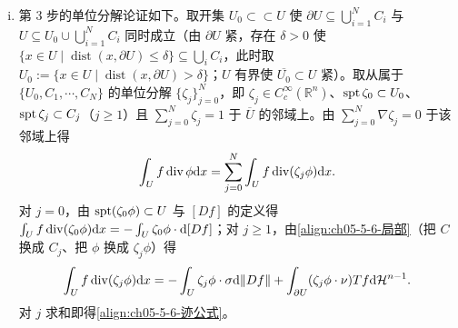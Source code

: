 \documentclass[../../main.tex]{subfiles}%
\begin{document}
\begin{remark}
\begin{enumerate}[(i)]
\item 第 3 步的单位分解论证如下。取开集 $U_0\subset\subset U$ 使 $\partial U\subseteq\bigcup_{i=1}^{N}C_i$ 与 $U\subseteq U_0\cup\bigcup_{i=1}^{N}C_i$ 同时成立（由 $\partial U$ 紧，存在 $\delta>0$ 使 $\{x\in U\mid\operatorname{dist}(x,\partial U)\leqslant\delta\}\subseteq\bigcup_iC_i$，此时取 $U_0:=\{x\in U\mid\operatorname{dist}(x,\partial U)>\delta\}$；$U$ 有界使 $\overline{U_0}\subset U$ 紧）。取从属于 $\{U_0,C_1,\cdots,C_N\}$ 的单位分解 $\{\zeta_j\}_{j=0}^{N}$，即 $\zeta_j\in C_c^{\infty}(\mathbb{R}^n)$、$\operatorname{spt}\zeta_0\subset U_0$、$\operatorname{spt}\zeta_j\subset C_j$（$j\geqslant1$）且 $\sum_{j=0}^{N}\zeta_j=1$ 于 $\overline{U}$ 的邻域上。由 $\sum_{j=0}^{N}\nabla\zeta_j=0$ 于该邻域上得
\begin{align*}
\int_U f\operatorname{div}\phi\mathrm{d} x=\sum_{j=0}^{N}\int_U f\operatorname{div}(\zeta_j\phi)\mathrm{d} x .
\end{align*}
对 $j=0$，由 $\operatorname{spt}(\zeta_0\phi)\subset U$ 与 $[Df]$ 的定义得 $\int_U f\operatorname{div}(\zeta_0\phi)\mathrm{d} x=-\int_U\zeta_0\phi\cdot\mathrm{d}[Df]$；对 $j\geqslant1$，由\eqref{align:ch05-5-6-局部}（把 $C$ 换成 $C_j$、把 $\phi$ 换成 $\zeta_j\phi$）得
\begin{align*}
\int_U f\operatorname{div}(\zeta_j\phi)\mathrm{d} x=-\int_U\zeta_j\phi\cdot\sigma\mathrm{d}\lVert Df\rVert+\int_{\partial U}(\zeta_j\phi\cdot\nu)Tf\mathrm{d}\mathcal{H}^{n-1}.
\end{align*}
对 $j$ 求和即得\eqref{align:ch05-5-6-迹公式}。
\end{enumerate}
\end{remark}
\end{document}
